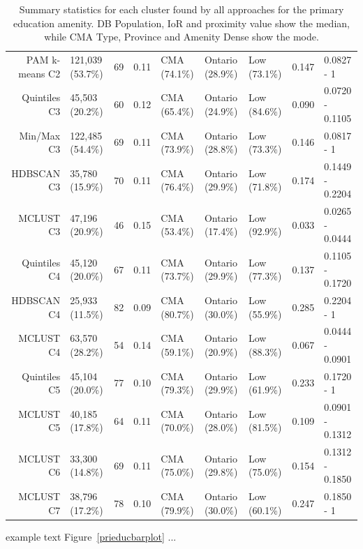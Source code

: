 \documentclass[11pt, a4paper]{article}
\begin{document}
\begin{table}[ht]
{\begin{tabular}{|r|llllllll|}
  PAM k-means C2 & 121,039 (53.7\%) & 69 & 0.11 & CMA (74.1\%) & Ontario (28.9\%) & Low (73.1\%) & 0.147 & 0.0827 - 1 \\ 
  Quintiles C3 & 45,503 (20.2\%) & 60 & 0.12 & CMA (65.4\%) & Ontario (24.9\%) & Low (84.6\%) & 0.090 & 0.0720 - 0.1105 \\ 
  Min/Max C3 & 122,485 (54.4\%) & 69 & 0.11 & CMA (73.9\%) & Ontario (28.8\%) & Low (73.3\%) & 0.146 & 0.0817 - 1 \\ 
  HDBSCAN C3 & 35,780 (15.9\%) & 70 & 0.11 & CMA (76.4\%) & Ontario (29.9\%) & Low (71.8\%) & 0.174 & 0.1449 - 0.2204 \\ 
  MCLUST C3 & 47,196 (20.9\%) & 46 & 0.15 & CMA (53.4\%) & Ontario (17.4\%) & Low (92.9\%) & 0.033 & 0.0265 - 0.0444 \\ 
  Quintiles C4 & 45,120 (20.0\%) & 67 & 0.11 & CMA (73.7\%) & Ontario (29.9\%) & Low (77.3\%) & 0.137 & 0.1105 - 0.1720 \\ 
  HDBSCAN C4 & 25,933 (11.5\%) & 82 & 0.09 & CMA (80.7\%) & Ontario (30.0\%) & Low (55.9\%) & 0.285 & 0.2204 - 1 \\ 
  MCLUST C4 & 63,570 (28.2\%) & 54 & 0.14 & CMA (59.1\%) & Ontario (20.9\%) & Low (88.3\%) & 0.067 & 0.0444 - 0.0901 \\ 
  Quintiles C5 & 45,104 (20.0\%) & 77 & 0.10 & CMA (79.3\%) & Ontario (29.9\%) & Low (61.9\%) & 0.233 & 0.1720 - 1 \\ 
  MCLUST C5 & 40,185 (17.8\%) & 64 & 0.11 & CMA (70.0\%) & Ontario (28.0\%) & Low (81.5\%) & 0.109 & 0.0901 - 0.1312 \\ 
  MCLUST C6 & 33,300 (14.8\%) & 69 & 0.11 & CMA (75.0\%) & Ontario (29.8\%) & Low (75.0\%) & 0.154 & 0.1312 - 0.1850 \\ 
  MCLUST C7 & 38,796 (17.2\%) & 78 & 0.10 & CMA (79.9\%) & Ontario (30.0\%) & Low (60.1\%) & 0.247 & 0.1850 - 1 \\ 
   \hline
\end{tabular}}
\caption[Primary education cluster profiles]{Summary statistics for each cluster found by all approaches for the primary education amenity. DB Population, IoR and proximity value show the median, while CMA Type, Province and Amenity Dense show the mode.}\label{prieducprofile}
\end{table}










example text Figure~\ref{prieducbarplot} ...
\end{document}
